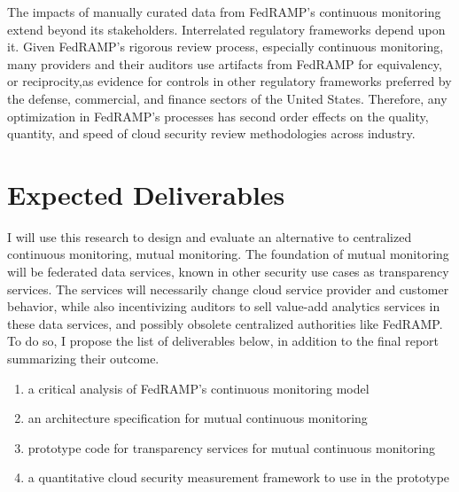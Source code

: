 \documentclass{jdf}
\begin{document}
The impacts of manually curated data from FedRAMP's continuous monitoring extend beyond its stakeholders. Interrelated regulatory frameworks depend upon it. Given FedRAMP's rigorous review process, especially continuous monitoring, many providers and their auditors use artifacts from FedRAMP for equivalency, or reciprocity,as evidence for controls in other regulatory frameworks preferred by the defense, commercial, and finance sectors of the United States. Therefore, any optimization in FedRAMP's processes has second order effects on the quality, quantity, and speed of cloud security review methodologies across industry.

\section{Expected Deliverables}

I will use this research to design and evaluate an alternative to centralized continuous monitoring, mutual monitoring. The foundation of mutual monitoring will be federated data services, known in other security use cases as transparency services. The services will necessarily change cloud service provider and customer behavior, while also incentivizing auditors to sell value-add analytics services in these data services, and possibly obsolete centralized authorities like FedRAMP. To do so, I propose the list of deliverables below, in addition to the final report summarizing their outcome. 

\begin{enumerate}
    \item a critical analysis of FedRAMP's continuous monitoring model
    \item an architecture specification for mutual continuous monitoring
    \item prototype code for transparency services for mutual continuous monitoring
    \item a quantitative cloud security measurement framework to use in the prototype
\end{enumerate}



\end{document}
